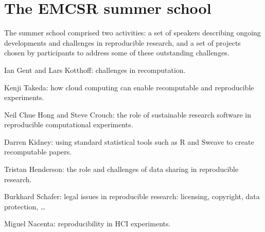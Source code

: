 \section{The EMCSR summer school}
\label{s:school}

The summer school comprised two activities: a set of speakers
describing ongoing developments and challenges in reproducible
research, and a set of projects chosen by participants to address some
of these outstanding challenges.

Ian Gent and Lars Kotthoff: challenges in recomputation.

Kenji Takeda: how cloud computing can enable recomputable and
reproducible experiments.

Neil Chue Hong and Steve Crouch: the role of sustainable research
software in reproducible computational experiments.

Darren Kidney: using standard statistical tools such as R and Sweave
to create recomputable papers.

Tristan Henderson: the role and challenges of data sharing in
reproducible research.

Burkhard Schafer: legal issues in reproducible research: licensing,
copyright, data protection, \ldots

Miguel Nacenta: reproducibility in HCI experiments.

